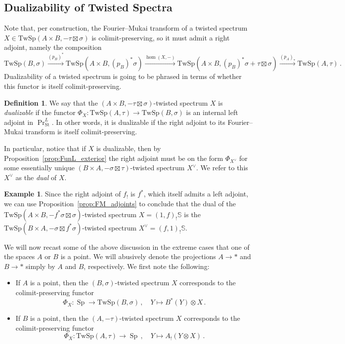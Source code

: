 \documentclass[10pt]{amsart}
\newcommand{\longto}{\longrightarrow}
\theoremstyle{plain}
\theoremstyle{definition}
\newtheorem{definition}[theorem]{Definition}
\newtheorem{example}[theorem]{Example}
\DeclareMathOperator{\Sp}{Sp}
\newcommand{\St}{\mathrm{St}}
\newcommand{\bS}{\mathbb{S}}
\newcommand{\TwSp}{\mathrm{TwSp}}
\begin{document}
\subsection{Dualizability of Twisted Spectra} \label{sec:dualizability_twisted_spectra}

Note that, per construction, the Fourier--Mukai transform of a twisted spectrum $X \in \TwSp(A \times B,-\tau \boxtimes \sigma)$ is colimit-preserving, so it must admit a right adjoint, namely the composition
\[
\TwSp(B,\sigma) \overset{(p_B)^*}\longto \TwSp(A \times B , (p_B)^* \sigma) \overset{\hom(X,-)}\longto \TwSp(A \times B , (p_B)^* \sigma + \tau \boxtimes \sigma) \overset{(p_A)_*}\longto \TwSp(A,\tau) \,.
\]
Dualizability of a twisted spectrum is going to be phrased in terms of whether this functor is itself colimit-preserving.

\begin{definition} \label{def:dualizable}
  We say that the $(A \times B , -\tau \boxtimes \sigma)$-twisted spectrum $X$ is \emph{dualizable} if the functor $\Phi_X : \TwSp(A,\tau) \to \TwSp(B,\sigma)$ is an internal left adjoint in $\Pr_{\St}^L$. In other words, it is dualizable if the right adjoint to its Fourier--Mukai transform is itself colimit-preserving.
\end{definition}

In particular, notice that if $X$ is dualizable, then by Proposition~\ref{prop:FunL_exterior} the right adjoint must be on the form $\Phi_{X^{\vee}}$ for some essentially unique $(B \times A , - \sigma \boxtimes \tau)$-twisted spectrum $X^\vee$. We refer to this $X^{\vee}$ as the \emph{dual} of $X$.

\begin{example}
  Since the right adjoint of $f_!$ is $f^*$, which itself admits a left adjoint, we can use Proposition~\ref{prop:FM_adjoints} to conclude that the dual of the $\TwSp(A \times B , -f^* \sigma \boxtimes \sigma)$-twisted spectrum $X = (1,f)_! \bS$ is the $\TwSp(B \times A, -\sigma \boxtimes f^* \sigma)$-twisted spectrum $X^\vee = (f,1)_! \bS$.
\end{example}

We will now recast some of the above discussion in the extreme cases that one of the spaces $A$ or $B$ is a point.
We will abusively denote the projections $A \to \ast$ and $B \to \ast$ simply by $A$ and $B$, respectively.
We first note the following:
\begin{itemize}
  \item If $A$ is a point, then the $(B,\sigma)$-twisted spectrum $X$ corresponds to the colimit-preserving functor
  \[
  \Phi_X : \Sp \longto \TwSp(B,\sigma) \,, \quad Y \mapsto B^*(Y) \otimes X \,.
  \]
  \item If $B$ is a point, then the $(A , -\tau)$-twisted spectrum $X$ corresponds to the colimit-preserving functor
  \[
  \Phi_X : \TwSp(A,\tau) \longto \Sp \,, \quad Y \mapsto A_! (Y \otimes X) \,.
  \]
\end{itemize}
\end{document}
